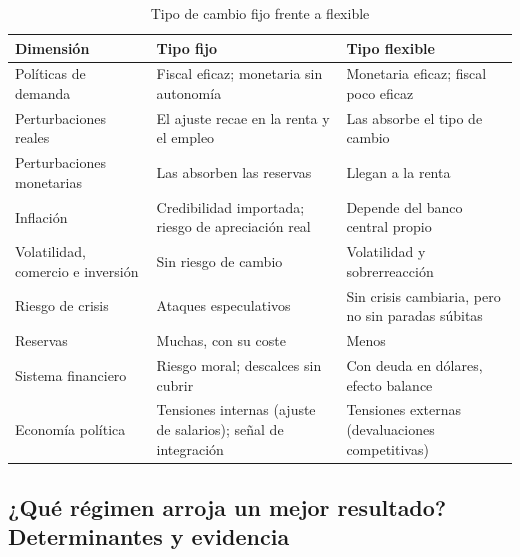 \documentclass[11pt]{article}
\begin{document}
\begin{table}[H]
\centering
\caption{Tipo de cambio fijo frente a flexible}\label{tab:fijo-flexible}
\small
\begin{tabular}{>{\raggedright\arraybackslash}m{3.2cm}>{\raggedright\arraybackslash}m{5.6cm}>{\raggedright\arraybackslash}m{5.6cm}}
\toprule
\rowcolor{tceeazulpalido}\textbf{Dimensión} & \textbf{Tipo fijo} & \textbf{Tipo flexible}\\
\midrule
Políticas de demanda & \textcolor{tceeverde}{Fiscal eficaz}; \textcolor{tceerojo}{monetaria sin autonomía} & \textcolor{tceeverde}{Monetaria eficaz}; \textcolor{tceerojo}{fiscal poco eficaz}\\
Perturbaciones reales & \textcolor{tceerojo}{El ajuste recae en la renta y el empleo} & \textcolor{tceeverde}{Las absorbe el tipo de cambio}\\
Perturbaciones monetarias & \textcolor{tceeverde}{Las absorben las reservas} & \textcolor{tceerojo}{Llegan a la renta}\\
Inflación & \textcolor{tceeverde}{Credibilidad importada}; \textcolor{tceerojo}{riesgo de apreciación real} & Depende del banco central propio\\
Volatilidad, comercio e inversión & \textcolor{tceeverde}{Sin riesgo de cambio} & \textcolor{tceerojo}{Volatilidad y sobrerreacción}\\
Riesgo de crisis & \textcolor{tceerojo}{Ataques especulativos} & \textcolor{tceeverde}{Sin crisis cambiaria}, pero no sin paradas súbitas\\
Reservas & \textcolor{tceerojo}{Muchas, con su coste} & \textcolor{tceeverde}{Menos}\\
Sistema financiero & \textcolor{tceerojo}{Riesgo moral; descalces sin cubrir} & \textcolor{tceerojo}{Con deuda en dólares, efecto balance}\\
Economía política & Tensiones internas (ajuste de salarios); señal de integración & Tensiones externas (devaluaciones competitivas)\\
\bottomrule
\end{tabular}
\end{table}

\subsection{¿Qué régimen arroja un mejor resultado?\cortetitulo Determinantes y evidencia}\label{sec:eleccion}
\end{document}
